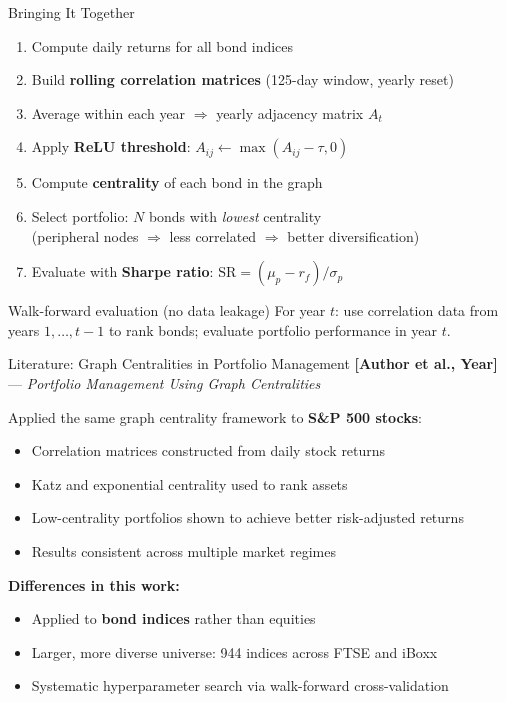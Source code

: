 \documentclass[aspectratio=169]{beamer}
\begin{document}
\begin{frame}{Bringing It Together}
    \begin{enumerate}
        \item Compute daily returns for all bond indices
        \item Build \textbf{rolling correlation matrices} (125-day window, yearly reset)
        \item Average within each year $\Rightarrow$ yearly adjacency matrix $A_t$
        \item Apply \textbf{ReLU threshold}: $A_{ij} \leftarrow \max(A_{ij} - \tau, 0)$
        \item Compute \textbf{centrality} of each bond in the graph
        \item Select portfolio: $N$ bonds with \emph{lowest} centrality\\
              (peripheral nodes $\Rightarrow$ less correlated $\Rightarrow$ better diversification)
        \item Evaluate with \textbf{Sharpe ratio}: $\mathrm{SR} = (\mu_p - r_f) / \sigma_p$
    \end{enumerate}

    \bigskip
    \begin{block}{Walk-forward evaluation (no data leakage)}
        For year $t$: use correlation data from years $1, \ldots, t-1$ to rank bonds;
        evaluate portfolio performance in year $t$.
    \end{block}
\end{frame}

\begin{frame}{Literature: Graph Centralities in Portfolio Management}
    \textbf{[Author et al., Year]} --- \emph{Portfolio Management Using Graph Centralities}

    \bigskip
    Applied the same graph centrality framework to \textbf{S\&P 500 stocks}:
    \begin{itemize}
        \item Correlation matrices constructed from daily stock returns
        \item Katz and exponential centrality used to rank assets
        \item Low-centrality portfolios shown to achieve better risk-adjusted returns
        \item Results consistent across multiple market regimes
    \end{itemize}

    \bigskip
    \textbf{Differences in this work:}
    \begin{itemize}
        \item Applied to \textbf{bond indices} rather than equities
        \item Larger, more diverse universe: 944 indices across FTSE and iBoxx
        \item Systematic hyperparameter search via walk-forward cross-validation
    \end{itemize}
\end{frame}
\end{document}
